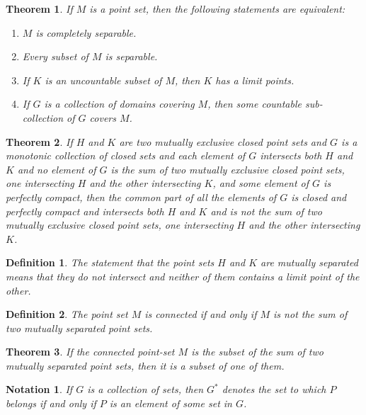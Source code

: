 \documentclass[10pt]{report}
\newtheorem{theorem}{Theorem}
\newtheorem{definition}{Definition}
\newtheorem*{notation}{Notation}
\begin{document}
\begin{theorem}
 If $M$ is a point set, then the following statements are equivalent:
\begin{enumerate}
 \item $M$ is completely separable.
 \item Every subset of $M$ is separable.
 \item If $K$ is an uncountable subset of $M$, then $K$ has a limit points.
 \item If $G$ is a collection of domains covering $M$, then some countable sub-collection of $G$ covers $M$.
\end{enumerate}
\end{theorem}

\begin{theorem}
 If $H$ and $K$ are two mutually exclusive closed point sets and $G$ is a monotonic collection of closed sets and each
element of $G$ intersects both $H$ and $K$ and no element of $G$ is the sum of two mutually exclusive closed point sets,
one intersecting $H$ and the other intersecting $K$, and some element of $G$ is perfectly compact, then the common part
of all the elements of $G$ is closed and perfectly compact and intersects both $H$ and $K$ and is not the sum of two
mutually exclusive closed point sets, one intersecting $H$ and the other intersecting $K$.
\end{theorem}

\begin{definition}
 The statement that the point sets $H$ and $K$ are mutually separated means that they do not intersect and neither of
them contains a limit point of the other.
\end{definition}

\begin{definition}
 The point set $M$ is connected if and only if $M$ is not the sum of two mutually separated point sets.
\end{definition}

\begin{theorem}
 If the connected point-set $M$ is the subset of the sum of two mutually separated point sets, then it is a subset of
one
of them.
\end{theorem}

\begin{notation}
 If $G$ is a collection of sets, then $G^*$ denotes the set to which $P$ belongs if and only if $P$ is an element of
some set in $G$.
\end{notation}
\end{document}
